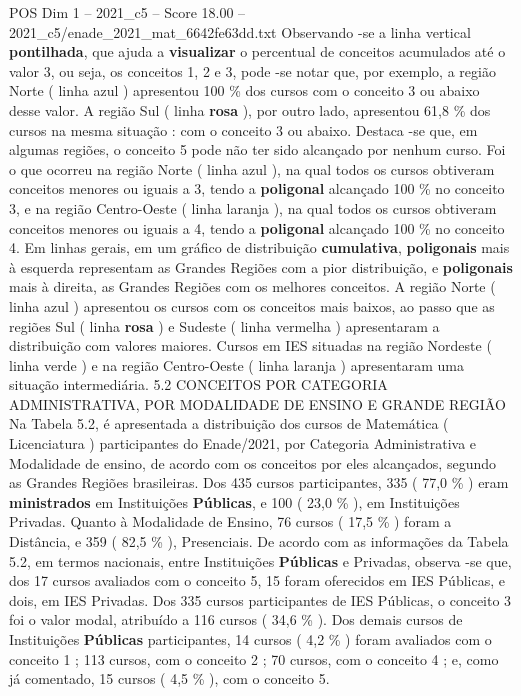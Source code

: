 \begin{textsample}{POS Dim 1 – 2021\_c5 – Score 18.00 – 2021\_c5/enade\_2021\_mat\_6642fe63dd.txt}
Observando -se a linha vertical \textbf{pontilhada}, que ajuda a \textbf{visualizar} o percentual de conceitos acumulados até o valor 3, ou seja, os conceitos 1, 2 e 3, pode -se notar que, por exemplo, a região Norte ( linha azul ) apresentou 100 \% dos cursos com o conceito 3 ou abaixo desse valor.
A região Sul ( linha \textbf{rosa} ), por outro lado, apresentou 61,8 \% dos cursos na mesma situação : com o conceito 3 ou abaixo.
Destaca -se que, em algumas regiões, o conceito 5 pode não ter sido alcançado por nenhum curso.
Foi o que ocorreu na região Norte ( linha azul ), na qual todos os cursos obtiveram conceitos menores ou iguais a 3, tendo a \textbf{poligonal} alcançado 100 \% no conceito 3, e na região Centro-Oeste ( linha laranja ), na qual todos os cursos obtiveram conceitos menores ou iguais a 4, tendo a \textbf{poligonal} alcançado 100 \% no conceito 4.
Em linhas gerais, em um gráfico de distribuição \textbf{cumulativa}, \textbf{poligonais} mais à esquerda representam as Grandes Regiões com a pior distribuição, e \textbf{poligonais} mais à direita, as Grandes Regiões com os melhores conceitos.
A região Norte ( linha azul ) apresentou os cursos com os conceitos mais baixos, ao passo que as regiões Sul ( linha \textbf{rosa} ) e Sudeste ( linha vermelha ) apresentaram a distribuição com valores maiores.
Cursos em IES situadas na região Nordeste ( linha verde ) e na região Centro-Oeste ( linha laranja ) apresentaram uma situação intermediária. 5.2 CONCEITOS POR CATEGORIA ADMINISTRATIVA, POR MODALIDADE DE ENSINO E GRANDE REGIÃO Na Tabela 5.2, é apresentada a distribuição dos cursos de Matemática ( Licenciatura ) participantes do Enade/2021, por Categoria Administrativa e Modalidade de ensino, de acordo com os conceitos por eles alcançados, segundo as Grandes Regiões brasileiras.
Dos 435 cursos participantes, 335 ( 77,0 \% ) eram \textbf{ministrados} em Instituições \textbf{Públicas}, e 100 ( 23,0 \% ), em Instituições Privadas.
Quanto à Modalidade de Ensino, 76 cursos ( 17,5 \% ) foram a Distância, e 359 ( 82,5 \% ), Presenciais.
De acordo com as informações da Tabela 5.2, em termos nacionais, entre Instituições \textbf{Públicas} e Privadas, observa -se que, dos 17 cursos avaliados com o conceito 5, 15 foram oferecidos em IES Públicas, e dois, em IES Privadas.
Dos 335 cursos participantes de IES Públicas, o conceito 3 foi o valor modal, atribuído a 116 cursos ( 34,6 \% ).
Dos demais cursos de Instituições \textbf{Públicas} participantes, 14 cursos ( 4,2 \% ) foram avaliados com o conceito 1 ; 113 cursos, com o conceito 2 ; 70 cursos, com o conceito 4 ; e, como já comentado, 15 cursos ( 4,5 \% ), com o conceito 5.

\end{textsample}
